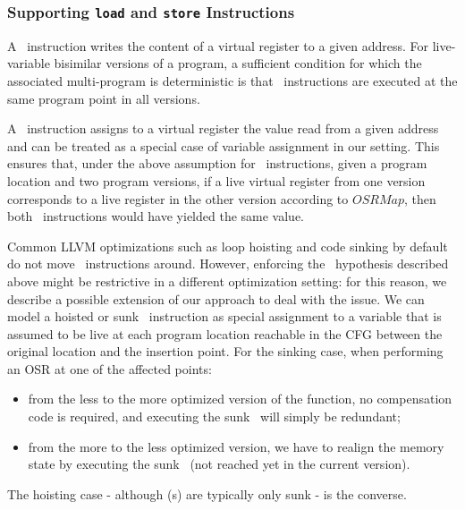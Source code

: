 \subsubsection*{Supporting \texttt{load} and \texttt{store} Instructions}
A \store\ instruction writes the content of a virtual register to a given address. For live-variable bisimilar versions of a program, a sufficient condition for which the associated multi-program is deterministic is that \store\ instructions are executed at the same program point in all versions.

A \load\ instruction assigns to a virtual register the value read from a given address and can be treated as a special case of variable assignment in our setting. This ensures that, under the above assumption for \store\ instructions, given a program location and two program versions, if a live virtual register from one version corresponds to a live register in the other version according to $OSRMap$, then both \load\ instructions would have yielded the same value.

Common LLVM optimizations such as loop hoisting and code sinking by default do not move \store\ instructions around. However, enforcing the \store\ hypothesis described above might be restrictive in a different optimization setting: for this reason, we describe a possible extension of our approach to deal with the issue. We can model a hoisted or sunk \store\ instruction as special assignment to a variable that is assumed to be live at each program location reachable in the CFG between the original location and the insertion point. For the sinking case, when performing an OSR at one of the affected points:
\begin{itemize}[itemsep=0pt,parsep=3pt,partopsep=0pt]
 \item from the less to the more optimized version of the function, no compensation code is required, and executing the sunk \store\ will simply be redundant;
 \item from the more to the less optimized version, we have to realign the memory state by executing the sunk \store\ (not reached yet in the current version).
\end{itemize}
The hoisting case - although \store(s) are typically only sunk - is the converse.

